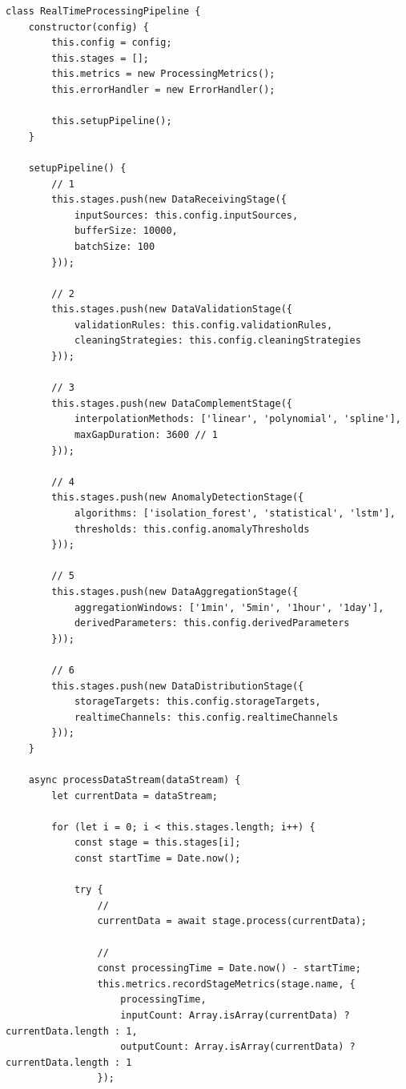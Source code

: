 \begin{lstlisting}[style=javascript]
class RealTimeProcessingPipeline {
    constructor(config) {
        this.config = config;
        this.stages = [];
        this.metrics = new ProcessingMetrics();
        this.errorHandler = new ErrorHandler();
        
        this.setupPipeline();
    }
    
    setupPipeline() {
        // 1
        this.stages.push(new DataReceivingStage({
            inputSources: this.config.inputSources,
            bufferSize: 10000,
            batchSize: 100
        }));
        
        // 2
        this.stages.push(new DataValidationStage({
            validationRules: this.config.validationRules,
            cleaningStrategies: this.config.cleaningStrategies
        }));
        
        // 3
        this.stages.push(new DataComplementStage({
            interpolationMethods: ['linear', 'polynomial', 'spline'],
            maxGapDuration: 3600 // 1
        }));
        
        // 4
        this.stages.push(new AnomalyDetectionStage({
            algorithms: ['isolation_forest', 'statistical', 'lstm'],
            thresholds: this.config.anomalyThresholds
        }));
        
        // 5
        this.stages.push(new DataAggregationStage({
            aggregationWindows: ['1min', '5min', '1hour', '1day'],
            derivedParameters: this.config.derivedParameters
        }));
        
        // 6
        this.stages.push(new DataDistributionStage({
            storageTargets: this.config.storageTargets,
            realtimeChannels: this.config.realtimeChannels
        }));
    }
    
    async processDataStream(dataStream) {
        let currentData = dataStream;
        
        for (let i = 0; i < this.stages.length; i++) {
            const stage = this.stages[i];
            const startTime = Date.now();
            
            try {
                // 
                currentData = await stage.process(currentData);
                
                // 
                const processingTime = Date.now() - startTime;
                this.metrics.recordStageMetrics(stage.name, {
                    processingTime,
                    inputCount: Array.isArray(currentData) ? currentData.length : 1,
                    outputCount: Array.isArray(currentData) ? currentData.length : 1
                });
                

\end{lstlisting}
